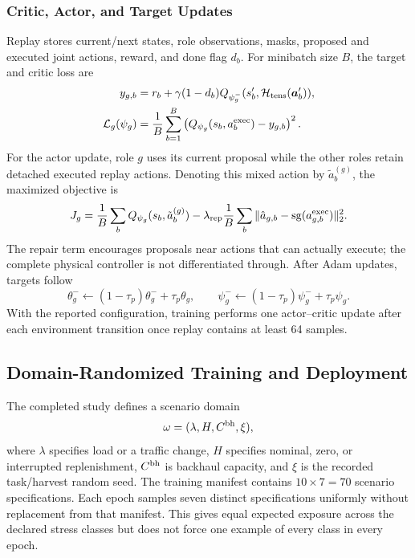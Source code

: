 \subsubsection{Critic, Actor, and Target Updates}
Replay stores current/next states, role observations, masks, proposed and
executed joint actions, reward, and done flag $d_b$. For minibatch size $B$,
the target and critic loss are
\begin{align}
y_{g,b}&=r_b+\gamma(1-d_b)Q_{\psi_g^-}
(s'_b,\mathcal H_{\rm tens}(\boldsymbol{a}'_b)),\label{eq:critic_target_new}\\
\mathcal L_g(\psi_g)&=\frac1B\sum_{b=1}^{B}
\left(Q_{\psi_g}(s_b,a_b^{\rm exec})-y_{g,b}\right)^2.
\label{eq:critic_loss_new}
\end{align}
For the actor update, role $g$ uses its current proposal while the other roles
retain detached executed replay actions. Denoting this mixed action by
$\tilde a_b^{(g)}$, the maximized objective is
\begin{equation}
J_g=\frac1B\sum_bQ_{\psi_g}(s_b,\tilde a_b^{(g)})
-\lambda_{\rm rep}\frac1B\sum_b
\|\hat a_{g,b}-\operatorname{sg}(a_{g,b}^{\rm exec})\|_2^2.
\label{eq:actor_objective_new}
\end{equation}
The repair term encourages proposals near actions that can actually execute;
the complete physical controller is not differentiated through. After Adam
updates, targets follow
\begin{equation}
\theta_g^-\leftarrow(1-\tau_p)\theta_g^-+\tau_p\theta_g,
\qquad
\psi_g^-\leftarrow(1-\tau_p)\psi_g^-+\tau_p\psi_g.
\label{eq:polyak_new}
\end{equation}
With the reported configuration, training performs one actor--critic update
after each environment transition once replay contains at least 64 samples.

\subsection{Domain-Randomized Training and Deployment}
The completed study defines a scenario domain
\begin{equation}
\omega=(\lambda,H,C^{\rm bh},\xi),
\label{eq:domain_tuple_correct}
\end{equation}
where $\lambda$ specifies load or a traffic change, $H$ specifies nominal,
zero, or interrupted replenishment, $C^{\rm bh}$ is backhaul capacity, and
$\xi$ is the recorded task/harvest random seed. The training manifest contains
$10\times7=70$ scenario specifications. Each epoch samples seven distinct
specifications uniformly without replacement from that manifest. This gives
equal expected exposure across the declared stress classes but does not force
one example of every class in every epoch.

